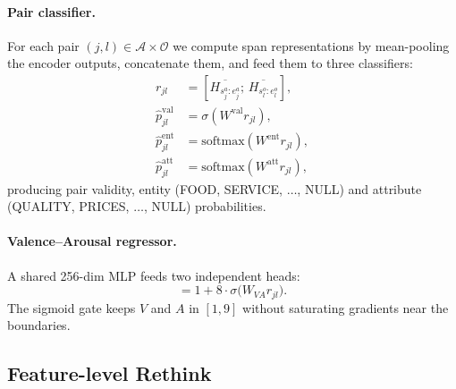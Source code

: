 \documentclass[11pt]{article}
\begin{document}
\paragraph{Pair classifier.}
For each pair $(j,l) \in \mathcal{A}\times\mathcal{O}$ we compute span
representations by mean-pooling the encoder outputs, concatenate them,
and feed them to three classifiers:
\begin{align}
r_{jl} &= [\overline{H_{s^a_j:e^a_j}};\, \overline{H_{s^o_l:e^o_l}}],\\
\hat p^\text{val}_{jl} &= \sigma(W^\text{val} r_{jl}),\\
\hat p^\text{ent}_{jl} &= \mathrm{softmax}(W^\text{ent} r_{jl}),\\
\hat p^\text{att}_{jl} &= \mathrm{softmax}(W^\text{att} r_{jl}),
\end{align}
producing pair validity, entity (FOOD, SERVICE, $\dots$, NULL) and
attribute (QUALITY, PRICES, $\dots$, NULL) probabilities.

\paragraph{Valence--Arousal regressor.}
A shared 256-dim MLP feeds two independent heads:
\begin{equation}
[V_{jl}, A_{jl}] = 1 + 8\cdot\sigma\!\big(W_{VA} r_{jl}\big).
\label{eq:vahead}
\end{equation}
The sigmoid gate keeps $V$ and $A$ in $[1,9]$ without saturating
gradients near the boundaries.

\subsection{Feature-level Rethink}
\label{sec:method:rethink}
\end{document}
